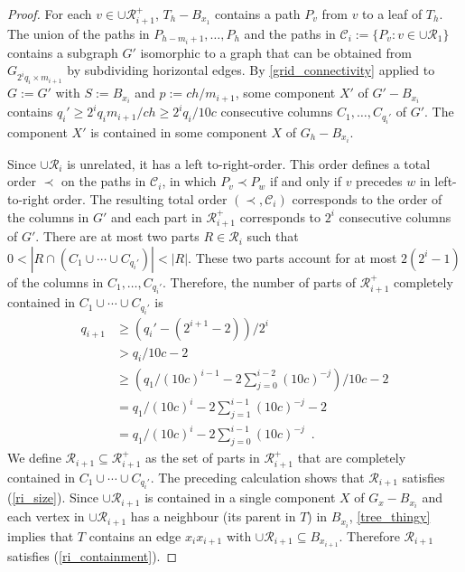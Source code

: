 \documentclass{patmorin}
\renewcommand{\ge}{\geqslant}
\begin{document}
\begin{proof}
   For each $v\in \cup\mathcal{R}_{i+1}^+$, $T_h-B_{x_1}$ contains a path $P_v$ from $v$ to a leaf of $T_h$.  The union of the paths in $P_{h-m_i+1},\ldots,P_{h}$ and the paths in $\mathcal{C}_i:=\{P_v:v\in\cup\mathcal{R}_1\}$ contains a subgraph $G'$ isomorphic to a graph that can be obtained from $G_{2^{i}q_i\times m_{i+1}}$ by subdividing horizontal edges.  By \cref{grid_connectivity} applied to $G:=G'$ with $S:=B_{x_i}$ and $p:=ch/m_{i+1}$, some component $X'$ of $G'-B_{x_i}$ contains  $q_i'\ge 2^{i}q_im_{i+1}/ch\ge 2^iq_i/10c$ consecutive columns $C_1,\ldots,C_{q_i'}$ of $G'$.  The component $X'$ is contained in some component $X$ of $G_h-B_{x_i}$.

  Since $\cup\mathcal{R}_i$ is unrelated, it has a left to-right-order. This order defines a total order $\prec$ on the paths in $\mathcal{C}_i$, in which $P_v\prec P_w$ if and only if $v$ precedes $w$ in left-to-right order. The resulting total order $(\prec,\mathcal{C}_i)$ corresponds to the order of the columns in $G'$ and each part in $\mathcal{R}_{i+1}^+$ corresponds to $2^i$ consecutive columns of $G'$. There are at most two parts $R\in\mathcal{R}_i$ such that $0 < |R\cap (C_1\cup\cdots\cup C_{q_i'})| < |R|$.  These two parts account for at most $2(2^{i}-1)$ of the columns in $C_1,\ldots, C_{q_i'}$.  Therefore, the number of parts of $\mathcal{R}_{i+1}^+$ completely contained in $C_1\cup\cdots\cup C_{q_i'}$ is
  \begin{align*}
     q_{i+1} & \ge (q_i'-(2^{i+1}-2))/2^i \\
      & > q_i/10c - 2 \\
      & \ge \left(q_1/(10c)^{i-1} - 2\sum_{j=0}^{i-2}(10c)^{-j}\right)/10c-2\\
      & = q_1/(10c)^{i} - 2\sum_{j=1}^{i-1}(10c)^{-j}-2\\
      & = q_1/(10c)^{i} - 2\sum_{j=0}^{i-1}(10c)^{-j} \enspace .
  \end{align*}
  We define $\mathcal{R}_{i+1}\subseteq\mathcal{R}_{i+1}^+$ as the set of parts in $\mathcal{R}_{i+1}^+$ that are completely contained in $C_1\cup\cdots\cup C_{q_i'}$.  The preceding calculation shows that $\mathcal{R}_{i+1}$ satisfies (\ref{ri_size}).  Since $\cup\mathcal{R}_{i+1}$ is contained in a single component $X$ of $G_x-B_{x_i}$ and each vertex in $\cup\mathcal{R}_{i+1}$ has a neighbour (its parent in $T$) in $B_{x_i}$, \cref{tree_thingy} implies that $T$ contains an edge $x_{i}x_{i+1}$ with $\cup\mathcal{R}_{i+1}\subseteq B_{x_{i+1}}$. Therefore $\mathcal{R}_{i+1}$ satisfies (\ref{ri_containment}).


\end{proof}
\end{document}
